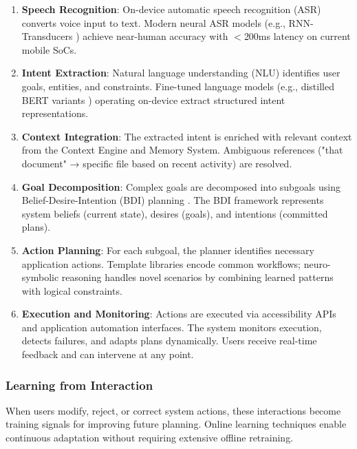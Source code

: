 \documentclass[conference]{IEEEtran}
\begin{document}
\begin{enumerate}
\item \textbf{Speech Recognition}: On-device automatic speech recognition (ASR) converts voice input to text. Modern neural ASR models (e.g., RNN-Transducers \cite{graves2013speech}) achieve near-human accuracy with $<$200ms latency on current mobile SoCs.

\item \textbf{Intent Extraction}: Natural language understanding (NLU) identifies user goals, entities, and constraints. Fine-tuned language models (e.g., distilled BERT variants \cite{sanh2019distilbert}) operating on-device extract structured intent representations.

\item \textbf{Context Integration}: The extracted intent is enriched with relevant context from the Context Engine and Memory System. Ambiguous references ("that document" → specific file based on recent activity) are resolved.

\item \textbf{Goal Decomposition}: Complex goals are decomposed into subgoals using Belief-Desire-Intention (BDI) planning \cite{rao1995bdi}. The BDI framework represents system beliefs (current state), desires (goals), and intentions (committed plans).

\item \textbf{Action Planning}: For each subgoal, the planner identifies necessary application actions. Template libraries encode common workflows; neuro-symbolic reasoning \cite{garcez2019neural} handles novel scenarios by combining learned patterns with logical constraints.

\item \textbf{Execution and Monitoring}: Actions are executed via accessibility APIs and application automation interfaces. The system monitors execution, detects failures, and adapts plans dynamically. Users receive real-time feedback and can intervene at any point.
\end{enumerate}

\subsubsection{Learning from Interaction}

When users modify, reject, or correct system actions, these interactions become training signals for improving future planning. Online learning techniques \cite{hoi2021online} enable continuous adaptation without requiring extensive offline retraining.
\end{document}
